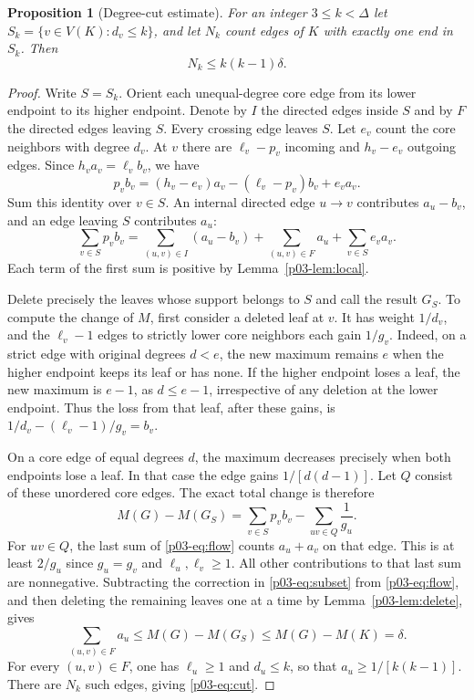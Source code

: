 \documentclass[11pt,a4paper]{article}
\newtheorem{proposition}[theorem]{Proposition}
\begin{document}
\begin{proposition}[Degree-cut estimate]\label{p03-prop:cut}
For an integer $3\le k<\Delta$ let $S_k=\{v\in V(K):d_v\le k\}$,
and let $N_k$ count edges of $K$ with exactly one end in $S_k$. Then
\begin{equation}\label{p03-eq:cut}
 N_k\le k(k-1)\delta .
\end{equation}
\end{proposition}
\begin{proof}
Write $S=S_k$. Orient each unequal-degree core edge from its lower
endpoint to its higher endpoint. Denote by $I$ the directed edges
inside $S$ and by $F$ the directed edges leaving $S$. Every crossing
edge leaves $S$. Let $e_v$ count the core neighbors with degree $d_v$.
At $v$ there are $\ell_v-p_v$ incoming and $h_v-e_v$ outgoing edges.
Since $h_v a_v=\ell_v b_v$, we have
\[
 p_v b_v=(h_v-e_v)a_v-(\ell_v-p_v)b_v+e_v a_v .
\]
Sum this identity over $v\in S$. An internal directed edge $u\to v$
contributes $a_u-b_v$, and an edge leaving $S$ contributes $a_u$:
\begin{equation}\label{p03-eq:flow}
 \sum_{v\in S}p_v b_v
 =\sum_{(u,v)\in I}(a_u-b_v)+\sum_{(u,v)\in F}a_u
        +\sum_{v\in S}e_v a_v .
\end{equation}
Each term of the first sum is positive by Lemma~\ref{p03-lem:local}.

Delete precisely the leaves whose support belongs to $S$ and call the
result $G_S$. To compute the change of $M$, first consider a deleted
leaf at $v$. It has weight $1/d_v$, and the $\ell_v-1$ edges to
strictly lower core neighbors each gain $1/g_v$. Indeed, on a strict
edge with original degrees $d<e$, the new maximum remains $e$ when
the higher endpoint keeps its leaf or has none. If the higher endpoint
loses a leaf, the new maximum is $e-1$, as $d\le e-1$, irrespective
of any deletion at the lower endpoint. Thus the loss from that leaf,
after these gains, is $1/d_v-(\ell_v-1)/g_v=b_v$.

On a core edge of equal degrees $d$, the maximum decreases precisely
when both endpoints lose a leaf. In that case the edge gains
$1/[d(d-1)]$. Let $Q$ consist of these unordered core edges. The
exact total change is therefore
\begin{equation}\label{p03-eq:subset}
 M(G)-M(G_S)=\sum_{v\in S}p_v b_v-\sum_{uv\in Q}\frac1{g_u}.
\end{equation}
For $uv\in Q$, the last sum of \eqref{p03-eq:flow} counts $a_u+a_v$
on that edge. This is at least $2/g_u$ since $g_u=g_v$ and
$\ell_u,\ell_v\ge1$. All other contributions to that last sum are
nonnegative. Subtracting the correction in \eqref{p03-eq:subset} from
\eqref{p03-eq:flow}, and then deleting the remaining leaves one at a time
by Lemma~\ref{p03-lem:delete}, gives
\[
 \sum_{(u,v)\in F}a_u\le M(G)-M(G_S)\le M(G)-M(K)=\delta .
\]
For every $(u,v)\in F$, one has $\ell_u\ge1$ and $d_u\le k$, so that
$a_u\ge1/[k(k-1)]$. There are $N_k$ such edges, giving \eqref{p03-eq:cut}.
\end{proof}
\end{document}
